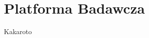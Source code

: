 \documentclass[knowledge.tex]{subfiles}
\begin{document}
    \section{Platforma Badawcza}
    Kakaroto
\end{document}
